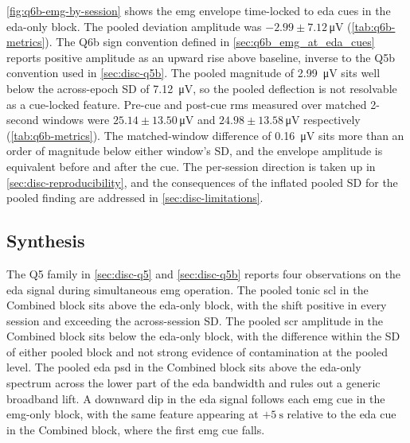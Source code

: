 \autoref{fig:q6b-emg-by-session} shows the \gls{emg} envelope time-locked to \gls{eda} cues in the \gls{eda}-only block. The pooled deviation amplitude was $-\num{2.99} \pm \num{7.12}$\,\si{\micro\volt} (\autoref{tab:q6b-metrics}). The Q6b sign convention defined in \autoref{sec:q6b_emg_at_eda_cues} reports positive amplitude as an upward rise above baseline, inverse to the Q5b convention used in \autoref{sec:disc-q5b}. The pooled magnitude of \SI{2.99}{\micro\volt} sits well below the across-epoch SD of \SI{7.12}{\micro\volt}, so the pooled deflection is not resolvable as a cue-locked feature. Pre-cue and post-cue \gls{rms} measured over matched 2-second windows were $\num{25.14} \pm \num{13.50}$\,\si{\micro\volt} and $\num{24.98} \pm \num{13.58}$\,\si{\micro\volt} respectively (\autoref{tab:q6b-metrics}). The matched-window difference of \SI{0.16}{\micro\volt} sits more than an order of magnitude below either window's SD, and the envelope amplitude is equivalent before and after the cue. The per-session direction is taken up in \autoref{sec:disc-reproducibility}, and the consequences of the inflated pooled SD for the pooled finding are addressed in \autoref{sec:disc-limitations}.

\subsection{Synthesis}
\label{sec:disc-cross-synthesis}

The Q5 family in \autoref{sec:disc-q5} and \autoref{sec:disc-q5b} reports four observations on the \gls{eda} signal during simultaneous \gls{emg} operation. The pooled tonic \gls{scl} in the Combined block sits above the \gls{eda}-only block, with the shift positive in every session and exceeding the across-session SD. The pooled \gls{scr} amplitude in the Combined block sits below the \gls{eda}-only block, with the difference within the SD of either pooled block and not strong evidence of contamination at the pooled level. The pooled \gls{eda} \gls{psd} in the Combined block sits above the \gls{eda}-only spectrum across the lower part of the \gls{eda} bandwidth and rules out a generic broadband lift. A downward dip in the \gls{eda} signal follows each \gls{emg} cue in the \gls{emg}-only block, with the same feature appearing at $+\SI{5}{\second}$ relative to the \gls{eda} cue in the Combined block, where the first \gls{emg} cue falls.

